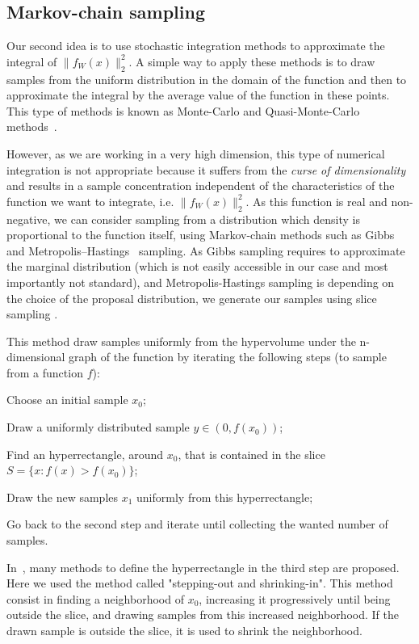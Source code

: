\documentclass{article}
\begin{document}
\subsection{Markov-chain sampling}
Our second idea is to use stochastic integration methods to approximate the integral of $\| f_W(x)\|_2^2$. A simple way to apply these methods is to draw samples from the uniform distribution in the domain of the function and then to approximate the integral by the average value of the function in these points. This type of methods is known as Monte-Carlo and Quasi-Monte-Carlo methods~\cite{caflisch1998monte}.


However, as we are working in a very high dimension, this type of numerical integration is not appropriate because it suffers from the \textit{curse of dimensionality} and results in a sample concentration independent of the characteristics of the function we want to integrate, i.e. $\| f_W(x)\|_2^2$. As this function is real and non-negative, we can consider sampling from a distribution which density is proportional to the function itself, using Markov-chain methods such as Gibbs~\cite{casella1992explaining}  and Metropolis–Hastings~\cite{hastings1970monte} sampling. As Gibbs sampling requires to approximate the marginal distribution (which is not easily accessible in our case and most importantly not standard), and Metropolis-Hastings sampling is depending on the choice of the proposal distribution, we generate our samples using slice sampling \cite{neal2003}.


This method draw samples uniformly from the hypervolume under the n-dimensional graph  of the function by iterating the following steps (to sample from a function $f$):
\begin{inparaenum}[(i)]
\item Choose an initial sample $x_0$;
\item Draw a uniformly distributed sample $y \in (0, f(x_0))$;
\item Find an hyperrectangle, around $x_0$, that is contained in the slice $S =\lbrace x : f(x)>f(x_0)\rbrace$;
\item Draw the new samples $x_1$ uniformly from this hyperrectangle;
\item Go back to the second step and iterate until collecting the wanted number of samples.
\end{inparaenum}
In~\cite{neal2003}, many methods to define the hyperrectangle in the third step are proposed. Here we used the method called "stepping-out and shrinking-in". This method consist in finding a neighborhood of $x_0$, increasing it progressively until being outside the slice, and drawing samples from this increased neighborhood. If the drawn sample is outside the slice, it is used to shrink the neighborhood. 
\end{document}
